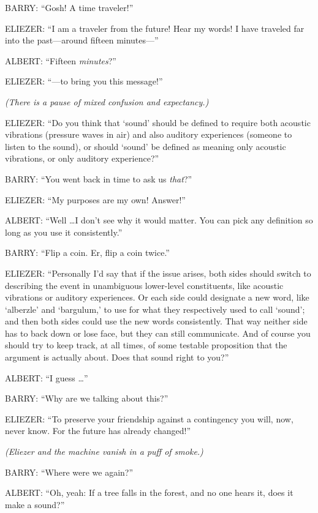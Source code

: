 {
 BARRY: ``Gosh! A time
traveler!''}

{
 ELIEZER: ``I am a traveler from the future! Hear
my words! I have traveled far into the past---around fifteen
minutes---''}

{
 ALBERT: ``Fifteen
\textit{minutes}?''}

{
 ELIEZER: ``---to bring you this
message!''}

{
 \textit{(There is a pause of mixed confusion and expectancy.)}}

{
 ELIEZER: ``Do you think that
`sound' should be defined to require
both acoustic vibrations (pressure waves in air) and also auditory
experiences (someone to listen to the sound), or should
`sound' be defined as meaning only
acoustic vibrations, or only auditory experience?''}

{
 BARRY: ``You went back in time to ask us
\textit{that}?''}

{
 ELIEZER: ``My purposes are my own!
Answer!''}

{
 ALBERT: ``Well \ldots I don't see
why it would matter. You can pick any definition so long as you use it
consistently.''}

{
 BARRY: ``Flip a coin. Er, flip a coin
twice.''}

{
 ELIEZER: ``Personally I'd say
that if the issue arises, both sides should switch to describing the
event in unambiguous lower-level constituents, like acoustic vibrations
or auditory experiences. Or each side could designate a new word, like
`alberzle' and
`bargulum,' to use for what they
respectively used to call `sound'; and
then both sides could use the new words consistently. That way neither
side has to back down or lose face, but they can still communicate. And
of course you should try to keep track, at all times, of some testable
proposition that the argument is actually about. Does that sound right
to you?''}

{
 ALBERT: ``I guess \ldots''}

{
 BARRY: ``Why are we talking about
this?''}

{
 ELIEZER: ``To preserve your friendship against a
contingency you will, now, never know. For the future has already
changed!''}

{
 \textit{(Eliezer and the machine vanish in a puff of smoke.)}}

{
 BARRY: ``Where were we
again?''}

{
 ALBERT: ``Oh, yeah: If a tree falls in the
forest, and no one hears it, does it make a sound?''}

